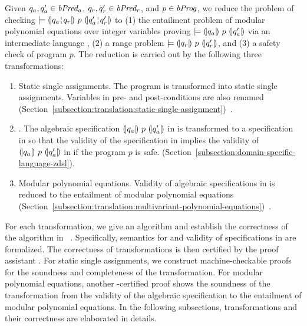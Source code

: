 
Given $q_a, q_a' \in \mathit{bPred_a}$, $q_r, q_r' \in \mathit{bPred_r}$, and $p \in \mathit{bProg}$, we reduce the problem of checking $\models \hoaretriple{q_a \andar q_r}{p}{q_a' \andar q_r'}$ to (1) the entailment problem of modular
polynomial equations over integer variables proving $\models {(\!|}{q_a}{|\!)}~{p}~{(\!|}{q_a'}{|\!)}$ via an intermediate language \zdsl, (2) a range problem $\models {(\!|}{q_r}{|\!)}~{p}~{(\!|}{q_r'}{|\!)}$, and (3) a safety check of program $p$.
The reduction is carried out by the following three transformations:
\begin{enumerate}
\item Static single assignments. The program is transformed
  into static single assignments. Variables in pre- and
  post-conditions are also renamed
  (Section~\ref{subsection:translation:static-single-assignment})~\cite{AWZ:88:DQVP}.
\item \zdsl. The algebraic specification ${(\!|}{q_a}{|\!)}~{p}~{(\!|}{q_a'}{|\!)}$ in \bvdsl is transformed to a specification in \zdsl so that the validity of the specification in \zdsl implies the validity of ${(\!|}{q_a}{|\!)}~{p}~{(\!|}{q_a'}{|\!)}$ in \bvdsl if the program $p$ is safe. (Section~\ref{subsection:domain-specific-language-zdsl}).
\item Modular polynomial equations. Validity of algebraic specifications in \zdsl
  is reduced to the entailment of modular polynomial equations
  (Section~\ref{subsection:translation:multivariant-polynomial-equations})~\cite{H:07:AENTP}.
\end{enumerate}

For each transformation, we give an algorithm and establish the
correctness of the algorithm in \coq~\cite{YC:2004:ITPPDC}.
Specifically, semantics for \zdsl and validity of specifications in \zdsl are formalized.
The correctness of transformations is then certified by the proof assistant \coq.
For static single assignments, we
construct machine-checkable proofs for the soundness and completeness
of the transformation. For modular polynomial equations, another
\coq-certified proof shows the soundness of the transformation
from the validity of the algebraic specification to the entailment of
modular polynomial equations. In the following subsections,
transformations and their correctness are elaborated in details.
